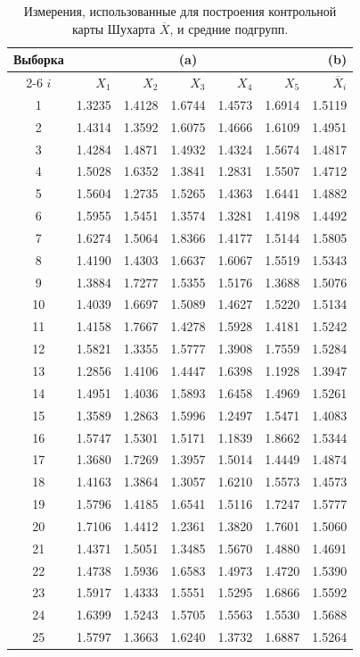 \begin{table}[htbp]
	\centering
	\caption{Измерения, использованные для построения контрольной карты Шухарта \(\overline{X}\), и средние подгрупп.}
	\label{tab:3.4}
	\renewcommand{\arraystretch}{1.05} %
	\begin{tabular}{c *{5}{r} r}
		\toprule
		Выборка & \multicolumn{5}{c}{(a)} & (b) \\
		\cmidrule(lr){2-6}
		\(i\) & \(X_1\) & \(X_2\) & \(X_3\) & \(X_4\) & \(X_5\) & \(\overline{X}_i\) \\
		\midrule
		1  & 1.3235 & 1.4128 & 1.6744 & 1.4573 & 1.6914 & 1.5119 \\
		2  & 1.4314 & 1.3592 & 1.6075 & 1.4666 & 1.6109 & 1.4951 \\
		3  & 1.4284 & 1.4871 & 1.4932 & 1.4324 & 1.5674 & 1.4817 \\
		4  & 1.5028 & 1.6352 & 1.3841 & 1.2831 & 1.5507 & 1.4712 \\
		5  & 1.5604 & 1.2735 & 1.5265 & 1.4363 & 1.6441 & 1.4882 \\
		6  & 1.5955 & 1.5451 & 1.3574 & 1.3281 & 1.4198 & 1.4492 \\
		7  & 1.6274 & 1.5064 & 1.8366 & 1.4177 & 1.5144 & 1.5805 \\
		8  & 1.4190 & 1.4303 & 1.6637 & 1.6067 & 1.5519 & 1.5343 \\
		9  & 1.3884 & 1.7277 & 1.5355 & 1.5176 & 1.3688 & 1.5076 \\
		10 & 1.4039 & 1.6697 & 1.5089 & 1.4627 & 1.5220 & 1.5134 \\
		11 & 1.4158 & 1.7667 & 1.4278 & 1.5928 & 1.4181 & 1.5242 \\
		12 & 1.5821 & 1.3355 & 1.5777 & 1.3908 & 1.7559 & 1.5284 \\
		13 & 1.2856 & 1.4106 & 1.4447 & 1.6398 & 1.1928 & 1.3947 \\
		14 & 1.4951 & 1.4036 & 1.5893 & 1.6458 & 1.4969 & 1.5261 \\
		15 & 1.3589 & 1.2863 & 1.5996 & 1.2497 & 1.5471 & 1.4083 \\
		16 & 1.5747 & 1.5301 & 1.5171 & 1.1839 & 1.8662 & 1.5344 \\
		17 & 1.3680 & 1.7269 & 1.3957 & 1.5014 & 1.4449 & 1.4874 \\
		18 & 1.4163 & 1.3864 & 1.3057 & 1.6210 & 1.5573 & 1.4573 \\
		19 & 1.5796 & 1.4185 & 1.6541 & 1.5116 & 1.7247 & 1.5777 \\
		20 & 1.7106 & 1.4412 & 1.2361 & 1.3820 & 1.7601 & 1.5060 \\
		21 & 1.4371 & 1.5051 & 1.3485 & 1.5670 & 1.4880 & 1.4691 \\
		22 & 1.4738 & 1.5936 & 1.6583 & 1.4973 & 1.4720 & 1.5390 \\
		23 & 1.5917 & 1.4333 & 1.5551 & 1.5295 & 1.6866 & 1.5592 \\
		24 & 1.6399 & 1.5243 & 1.5705 & 1.5563 & 1.5530 & 1.5688 \\
		25 & 1.5797 & 1.3663 & 1.6240 & 1.3732 & 1.6887 & 1.5264 \\
		\bottomrule
	\end{tabular}
\end{table}


